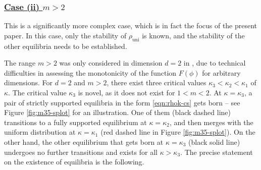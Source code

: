\documentclass[11pt]{amsart}
\newcommand{\rhou}{\rho_{\mathrm{uni}}}
\newcommand{\dm}{d} %
\begin{document}
\subsubsection{\underline{Case (ii) $m>2$}}
\label{subsubsect:prelim:mg2}
This is a significantly more complex case, which is in fact the focus of the present paper. In this case, only the stability of $\rhou$ is known, and the stability of the other equilibria needs to be established. 

The range $m>2$ was only considered in dimension $\dm=2$ in \cite{FePaVa2025}, due to technical difficulties in assessing the monotonicity of the function $F(\phi)$ for arbitrary dimensions. For $\dm =2$ and $m>2$, there exist three critical values $\kappa_3<\kappa_2<\kappa_1$ of $\kappa$. The critical value $\kappa_3$ is novel, as it does not exist for $1<m<2$. At $\kappa = \kappa_3$, a pair of strictly supported equilibria in the form \eqref{eqn:rhok-cs} gets born -- see Figure \ref{fig:m35-splot} for an illustration. One of them (black dashed line) transitions to a fully supported equilibrium at $\kappa=\kappa_2$, and then merges with the uniform distribution at $\kappa=\kappa_1$ (red dashed line in Figure \ref{fig:m35-splot}). On the other hand, the other equilibrium that gets born at $\kappa=\kappa_3$ (black solid line) undergoes no further transitions and exists for all $\kappa>\kappa_3$. The precise statement on the existence of equilibria is the following.
\end{document}
